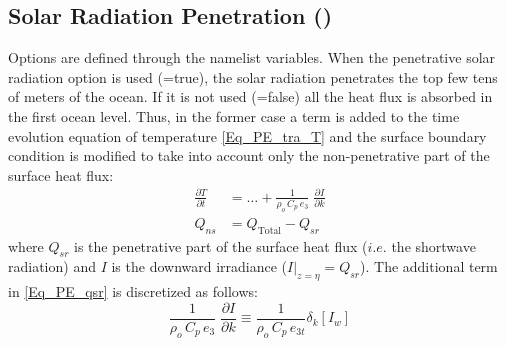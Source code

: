 \subsection   [Solar Radiation Penetration (\textit{traqsr})]
			{Solar Radiation Penetration ()}
\label{TRA_qsr}

Options are defined through the   namelist variables.
When the penetrative solar radiation option is used (=true), 
the solar radiation penetrates the top few tens of meters of the ocean. If it is not used 
(=false) all the heat flux is absorbed in the first ocean level. 
Thus, in the former case a term is added to the time evolution equation of 
temperature \eqref{Eq_PE_tra_T} and the surface boundary condition is 
modified to take into account only the non-penetrative part of the surface 
heat flux:
\begin{equation} \label{Eq_PE_qsr}
\begin{split}
\frac{\partial T}{\partial t} &= {\ldots} + \frac{1}{\rho_o\, C_p \,e_3} \; \frac{\partial I}{\partial k}	\\
Q_{ns} &= Q_\text{Total} - Q_{sr}
\end{split}
\end{equation}
where $Q_{sr}$ is the penetrative part of the surface heat flux ($i.e.$ the shortwave radiation) 
and $I$ is the downward irradiance ($\left. I \right|_{z=\eta}=Q_{sr}$). 
The additional term in \eqref{Eq_PE_qsr} is discretized as follows:
\begin{equation} \label{Eq_tra_qsr}
\frac{1}{\rho_o\, C_p \,e_3} \; \frac{\partial I}{\partial k} \equiv \frac{1}{\rho_o\, C_p\, e_{3t}} \delta_k \left[ I_w \right]
\end{equation}

